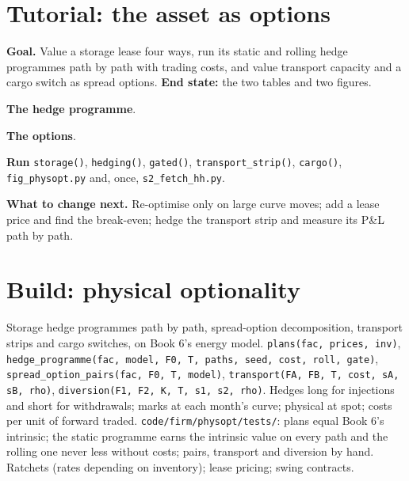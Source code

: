 \section{Tutorial: the asset as options}\label{tut:s2:storage-transport-and-physical-optionality:tut}

\begin{tutorial}
\textbf{Goal.} Value a storage lease four ways, run its static and rolling hedge programmes path by path with trading costs, and value transport
capacity and a cargo switch as spread options. \textbf{End state:} the two tables and two figures.
\begin{tutsteps}
\item \textbf{The hedge programme}.
\label{lst:s2:storage-transport-and-physical-optionality:programme}
\item \textbf{The options}.
\label{lst:s2:storage-transport-and-physical-optionality:options}
\item \textbf{Run} \texttt{storage()}, \texttt{hedging()}, \texttt{gated()}, \texttt{transport\_strip()}, \texttt{cargo()},
\texttt{fig\_physopt.py} and, once, \texttt{s2\_fetch\_hh.py}.
\end{tutsteps}
\textbf{What to change next.} Re-optimise only on large curve moves; add a lease price and find the break-even; hedge the transport strip and
measure its P\&L path by path.
\end{tutorial}

\section{Build: physical optionality}\label{bld:s2:storage-transport-and-physical-optionality:physopt}

\begin{build}
 Storage hedge programmes path by path, spread-option decomposition, transport strips and cargo switches, on Book 6's energy model.
 \texttt{plans(fac, prices, inv)}, \texttt{hedge\_programme(fac, model, F0, T, paths, seed, cost, roll, gate)},
\texttt{spread\_option\_pairs(fac, F0, T, model)}, \texttt{transport(FA, FB, T, cost, sA, sB, rho)}, \texttt{diversion(F1, F2, K, T, s1, s2,
rho)}.
 Hedges long for injections and short for withdrawals; marks at each month's curve; physical at spot; costs per unit of forward traded.
 \texttt{code/firm/physopt/tests/}: plans equal Book 6's intrinsic; the static programme earns the intrinsic value on every
path and the rolling one never less without costs; pairs, transport and diversion by hand.
 Ratchets (rates depending on inventory); lease pricing; swing contracts.
\end{build}

